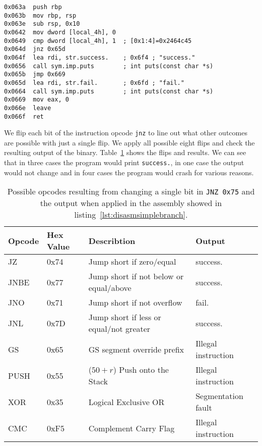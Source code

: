 \begin{minipage}{\linewidth}
\begin{lstlisting}[style=nasm,
                   caption={Disassemby of the main function created by the
code in listing~\ref{lst:csimbranch}. Shows machine code at given address
inside the ELF file, starting at \texttt{0x063a}.},
                   label={lst:disasmsimplebranch}]
0x063a  push rbp
0x063b  mov rbp, rsp
0x063e  sub rsp, 0x10
0x0642  mov dword [local_4h], 0
0x0649  cmp dword [local_4h], 1  ; [0x1:4]=0x2464c45
0x064d  jnz 0x65d
0x064f  lea rdi, str.success.    ; 0x6f4 ; "success."
0x0656  call sym.imp.puts        ; int puts(const char *s)
0x065b  jmp 0x669
0x065d  lea rdi, str.fail.       ; 0x6fd ; "fail."
0x0664  call sym.imp.puts        ; int puts(const char *s)
0x0669  mov eax, 0
0x066e  leave
0x066f  ret
\end{lstlisting}
\end{minipage}

We flip each bit of the instruction opcode \texttt{jnz} to line out what other
outcomes are possible with just a single flip. We apply all possible eight
flips and check the resulting output of the binary. Table~\ref{tab:jnzflips}
shows the flips and results. We can see that in three cases the program would
print \texttt{success.}, in one case the output would not change and in four
cases the program would crash for various reasons.

\begin{table}[]
\centering
\begin{tabular}{|l|l|l|l|}
\hline
Opcode & Hex Value & Describtion                                           &
Output              \\ \hline
JZ     & 0x74      & Jump short if zero/equal                              &
success.            \\ \hline
JNBE   & 0x77      & Jump short if not below or equal/above                &
success.            \\ \hline
JNO    & 0x71      & Jump short if not overflow                            &
fail.               \\ \hline
JNL    & 0x7D      & Jump short if less or equal/not greater               &
success.            \\ \hline
GS     & 0x65      & GS segment override prefix                            &
Illegal instruction \\ \hline
PUSH   & 0x55      & ($50+r$) Push onto the Stack &
Illegal instruction \\ \hline
XOR    & 0x35      & Logical Exclusive OR                                  &
Segmentation fault  \\ \hline
CMC    & 0xF5      & Complement Carry Flag                                 &
Illegal instruction \\ \hline
\end{tabular}
\caption{Possible opcodes resulting from changing a single bit in
\texttt{JNZ}~\texttt{0x75} and the output when applied in the assembly showed in
listing~\ref{lst:disasmsimplebranch}.}
\label{tab:jnzflips}
\end{table}

